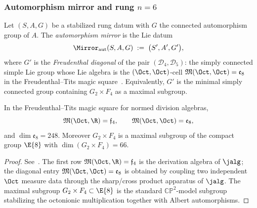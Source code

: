 \subsubsection{Automorphism mirror and rung $n=6$}
\label{sec:ladder:mirror-e8}

\begin{definition}\label{def:ladder:aut-mirror}
Let $(S,A,G)$ be a stabilized rung datum with $G$ the connected automorphism
group of $A$. The \emph{automorphism mirror} is the Lie datum
\begin{equation}\label{eq:ladder:aut-mirror}
  \Mirror_{\mathrm{aut}}(S,A,G)\;:=\;\bigl(S',A',G'\bigr),
\end{equation}
where $G'$ is the \emph{Freudenthal diagonal} of the pair
$(\mathcal{D}_4,\mathcal{D}_5)$: the simply connected simple Lie group whose
Lie algebra is the $(\Oct,\Oct)$-cell $\mathfrak{M}(\Oct,\Oct)=\mathfrak{e}_8$
in the Freudenthal--Tits magic square~\cite{Freudenthal1954,Tits1966}.
Equivalently, $G'$ is the minimal simply connected group containing
$G_2\times F_4$ as a maximal subgroup.
\end{definition}

\begin{theorem}\label{thm:ladder:freudenthal}
In the Freudenthal--Tits magic square for normed division algebras,
\begin{equation}\label{eq:ladder:magic}
  \mathfrak{M}(\Oct,\R)=\mathfrak{f}_4,
  \qquad
  \mathfrak{M}(\Oct,\Oct)=\mathfrak{e}_8,
\end{equation}
and $\dim\mathfrak{e}_8=248$. Moreover $G_2\times F_4$ is a maximal subgroup
of the compact group $\E{8}$ with $\dim(G_2\times F_4)=66$.
\end{theorem}

\begin{proof}
See~\cite{Freudenthal1954,Tits1966,SpringerVeldkamp2000}. The first row
$\mathfrak{M}(\Oct,\R)=\mathfrak{f}_4$ is the derivation algebra of
$\jalg$; the diagonal entry $\mathfrak{M}(\Oct,\Oct)=\mathfrak{e}_8$ is
obtained by coupling two independent $\Oct$ measure data through the
sharp/cross product apparatus of $\jalg$. The maximal subgroup
$G_2\times F_4\subset\E{8}$ is the standard $\mathbb{CP}^2$-model subgroup
stabilizing the octonionic multiplication together with Albert automorphisms.
\end{proof}

